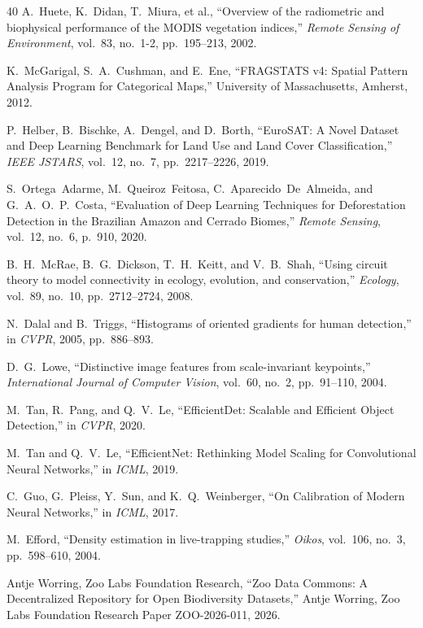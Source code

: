 \begin{thebibliography}{40}
A.~Huete, K.~Didan, T.~Miura, et al., ``Overview of the radiometric and biophysical performance of the MODIS vegetation indices,'' \emph{Remote Sensing of Environment}, vol.~83, no.~1-2, pp.~195--213, 2002.

K.~McGarigal, S.~A.~Cushman, and E.~Ene, ``FRAGSTATS v4: Spatial Pattern Analysis Program for Categorical Maps,'' University of Massachusetts, Amherst, 2012.

P.~Helber, B.~Bischke, A.~Dengel, and D.~Borth, ``EuroSAT: A Novel Dataset and Deep Learning Benchmark for Land Use and Land Cover Classification,'' \emph{IEEE JSTARS}, vol.~12, no.~7, pp.~2217--2226, 2019.

S.~Ortega~Adarme, M.~Queiroz~Feitosa, C.~Aparecido~De~Almeida, and G.~A.~O.~P.~Costa, ``Evaluation of Deep Learning Techniques for Deforestation Detection in the Brazilian Amazon and Cerrado Biomes,'' \emph{Remote Sensing}, vol.~12, no.~6, p.~910, 2020.

B.~H.~McRae, B.~G.~Dickson, T.~H.~Keitt, and V.~B.~Shah, ``Using circuit theory to model connectivity in ecology, evolution, and conservation,'' \emph{Ecology}, vol.~89, no.~10, pp.~2712--2724, 2008.

N.~Dalal and B.~Triggs, ``Histograms of oriented gradients for human detection,'' in \emph{CVPR}, 2005, pp.~886--893.

D.~G.~Lowe, ``Distinctive image features from scale-invariant keypoints,'' \emph{International Journal of Computer Vision}, vol.~60, no.~2, pp.~91--110, 2004.

M.~Tan, R.~Pang, and Q.~V.~Le, ``EfficientDet: Scalable and Efficient Object Detection,'' in \emph{CVPR}, 2020.

M.~Tan and Q.~V.~Le, ``EfficientNet: Rethinking Model Scaling for Convolutional Neural Networks,'' in \emph{ICML}, 2019.

C.~Guo, G.~Pleiss, Y.~Sun, and K.~Q.~Weinberger, ``On Calibration of Modern Neural Networks,'' in \emph{ICML}, 2017.

M.~Efford, ``Density estimation in live-trapping studies,'' \emph{Oikos}, vol.~106, no.~3, pp.~598--610, 2004.

Antje Worring, Zoo Labs Foundation Research, ``Zoo Data Commons: A Decentralized Repository for Open Biodiversity Datasets,'' Antje Worring, Zoo Labs Foundation Research Paper ZOO-2026-011, 2026.

\end{thebibliography}

